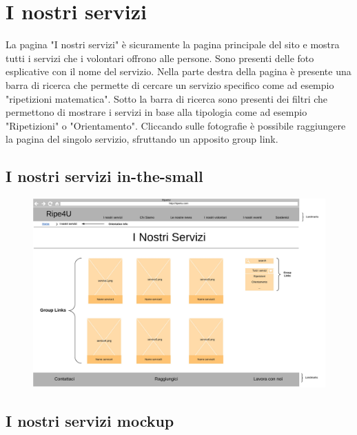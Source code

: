     \section{I nostri servizi}
    La pagina "I nostri servizi" è sicuramente la pagina principale del sito e
    mostra tutti i servizi che i volontari offrono alle persone. Sono presenti
    delle foto esplicative con il nome del servizio. Nella parte destra della
    pagina è presente una barra di ricerca che permette di cercare un servizio
    specifico come ad esempio "ripetizioni matematica". Sotto la barra di
    ricerca sono presenti dei filtri che permettono di mostrare i servizi in
    base alla tipologia come ad esempio "Ripetizioni" o "Orientamento".
    Cliccando sulle fotografie è possibile raggiungere la pagina del singolo
    servizio, sfruttando un apposito group link.
        \subsection{I nostri servizi in-the-small} 
        \begin{figure}[H]
            \centering
            \includegraphics[scale=0.45]{resources/images/iNostriServizi-in-the-small.jpg}
        \end{figure}

        \subsection{I nostri servizi mockup}
    
